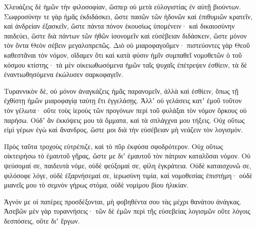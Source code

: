 {\par }{\PP {}Χλευάζεις δὲ ἡμῶν τὴν φιλοσοφίαν, ὥσπερ οὐ μετὰ εὐλογιστίας ἐν αὐτῇ βιούντων.
Σωφροσύνην τε γὰρ ἡμᾶς ἐκδιδάσκει, ὥστε πασῶν τῶν ἡδονῶν καὶ ἐπιθυμιῶν κρατεῖν, καὶ ἀνδρείαν ἐξασκεῖν, ὥστε πάντα πόνον ἑκουσίως ὑπομένειν·
καὶ δικαιοσύνην παιδεύει, ὥστε διὰ πάντων τῶν ἠθῶν ἰσονομεῖν καὶ εὐσέβειαν διδάσκειν, ὥστε μόνον τὸν ὄντα Θεὸν σέβειν μεγαλοπρεπῶς.
Διὸ οὐ μιαροφαγοῦμεν· πιστεύοντες γὰρ Θεοῦ καθεστᾶναι τὸν νόμον, οἴδαμεν ὅτι καὶ κατὰ φύσιν ἡμῖν συμπαθεῖ νομοθετῶν ὁ τοῦ κόσμου κτίστης·
τὰ μὲν οἰκειωθωσόμενα ἡμῶν ταῖς ψυχαῖς ἐπέτρεψεν ἐσθίειν, τὰ δὲ ἐναντιωθησόμενα ἐκώλυσεν σαρκοφαγεῖν.
\par }{\PP {}Τυραννικὸν δὲ, οὐ μόνον ἀναγκάζεις ἡμᾶς παρανομεῖν, ἀλλὰ καὶ ἐσθίειν, ὅπως τῇ ἐχθίστῃ ἡμῶν μιαροφαγίᾳ ταύτῃ ἔτι ἐγγελάσῃς.
Ἀλλʼ οὐ γελάσεις κατʼ ἐμοῦ τοῦτον τὸν γέλωτα·
οὔτε τοὺς ἱεροὺς τῶν προγόνων περὶ τοῦ φυλάξαι τὸν νόμον ὅρκους οὐ παρήσω.
Οὐδʼ ἂν ἐκκόψεις μου τὰ ὄμματα, καὶ τὰ σπλάγχνα μου τήξεις.
Οὐχ οὕτως εἰμὶ γέρων ἐγὼ καὶ ἄνανδρος, ὥστε μοι διὰ τὴν εὐσέβειαν μὴ νεάζειν τὸν λογισμόν.
\par }{\PP {}Πρὸς ταῦτα τροχοὺς εὐτρέπιζε, καὶ τὸ πῦρ ἐκφύσα σφοδρότερον.
Οὐχ οὕτως οἰκτειρήσω τὸ ἐμαυτοῦ γῆρας, ὥστε με διʼ ἐμαυτοῦ τὸν πάτριον καταλῦσαι νόμον.
Οὐ ψεύσομαί σε, παιδευτὰ νόμε, οὐδὲ φεύξομαί σε, φίλη ἐγκράτεια.
Οὐδὲ καταισχυνῶ σε, φιλόσοφε λόγε, οὐδὲ ἐξαρνήσεμαί σε, ἱερωσύνη τιμία, καὶ νομοθεσίας ἐπιστήμη·
οὐδὲ μιανεῖς μου τὸ σεμνὸν γήρως στόμα, οὐδὲ νομίμου βίου ἡλικίαν.
\par }{\PP {}Ἁγνόν με οἱ πατέρες προσδέξονται, μὴ φοβηθέντα σου τὰς μέχρι θανάτου ἀνάγκας.
Ἀσεβῶν μὲν γὰρ τυραννήσεις· τῶν δὲ ἐμῶν περὶ τῆς εὐσεβείας λογισμῶν οὔτε λόγοις δεσπόσεις, οὔτε διʼ ἔργων.

}
